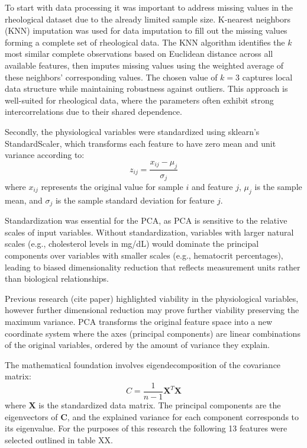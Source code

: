 \documentclass[12pt,letterpaper]{article}
\begin{document}
To start with data processing it was important to address missing values in the rheological dataset due to the already limited sample size. K-nearest neighbors (KNN)
imputation was used for data imputation to fill out the missing values forming a complete set of rheological data. The KNN algorithm identifies the $k$ most similar
complete observations based on Euclidean distance across all available features, then imputes missing values using the weighted average of these neighbors' corresponding values.
The chosen value of $k=3$ captures local data structure while maintaining robustness against outliers. This approach is well-suited for rheological data, where the parameters often
exhibit strong intercorrelations due to their shared dependence.

Secondly, the physiological variables were standardized using sklearn's StandardScaler, which transforms each feature to have zero mean and unit variance according to:
$$
    z_{ij} = \frac{x_{ij}-\mu_j}{\sigma_j}
$$
where $x_{ij}$ represents the original value for sample $i$ and feature $j$, $\mu_j$ is the sample mean, and $\sigma_j$ is the sample standard deviation for feature $j$.

Standardization was essential for the PCA, as PCA is sensitive to the relative scales of input variables. Without standardization,
variables with larger natural scales (e.g., cholesterol levels in mg/dL) would dominate the principal components over variables with smaller scales (e.g., hematocrit percentages),
leading to biased dimensionality reduction that reflects measurement units rather than biological relationships.

Previous research (cite paper) highlighted viability in the physiological variables, however further dimensional reduction may prove further viability preserving the maximum variance.
PCA transforms the original feature space into a new coordinate system where the axes (principal components) are linear combinations of the original variables,
ordered by the amount of variance they explain.

The mathematical foundation involves eigendecomposition of the covariance matrix:
$$
    C = \frac{1}{n-1} \mathbf{X}^T\mathbf{X}
$$
where $\mathbf{X}$ is the standardized data matrix. The principal components are the eigenvectors of $\mathbf{C}$, and the explained variance for each component corresponds to
its eigenvalue. For the purposes of this research the following 13 features were selected outlined in table XX.
\end{document}
